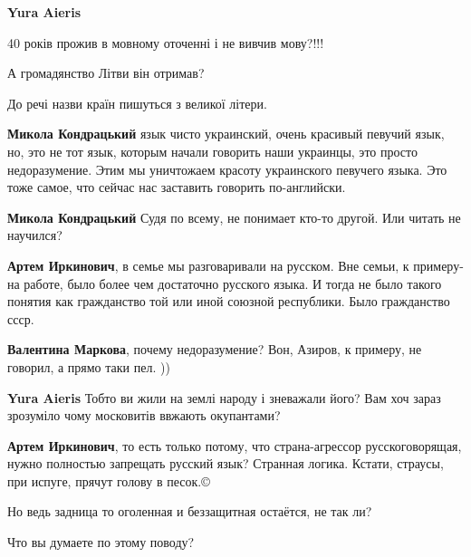 \begin{itemize}
\begin{itemize}
\textbf{Yura Aieris} 

40 років прожив в мовному оточенні і не вивчив мову?!!!

А громадянство Літви він отримав?

До речі назви країн пишуться з великої літери.

\textbf{Микола Кондрацький} язык чисто украинский, очень красивый певучий язык,
но, это не тот язык, которым начали говорить наши украинцы, это просто
недоразумение. Этим мы уничтожаем красоту украинского певучего языка. Это тоже
самое, что сейчас нас заставить говорить по-английски.

\textbf{Микола Кондрацький} Судя по всему, не понимает кто-то другой. Или читать не научился?

\textbf{Артем Иркинович}, в семье мы разговаривали на русском. Вне семьи, к примеру- на работе, было более чем достаточно русского языка. И тогда не было такого понятия как гражданство той или иной союзной республики. Было гражданство ссср.

\textbf{Валентина Маркова}, почему недоразумение?
Вон, Азиров, к примеру, не говорил, а прямо таки пел. ))

\textbf{Yura Aieris}
Тобто ви жили на землі народу і зневажали його? Вам хоч зараз зрозуміло чому московитів ввжають окупантами?

\textbf{Артем Иркинович}, то есть только потому, что страна-агрессор русскоговорящая,
нужно полностью запрещать русский язык? Странная логика. Кстати, страусы, при
испуге, прячут голову в песок.©

Но ведь задница то оголенная и беззащитная остаётся, не так ли?

Что вы думаете по этому поводу?

\end{itemize}


\end{itemize}
